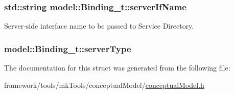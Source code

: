 \subsubsection[{\texorpdfstring{server\+If\+Name}{serverIfName}}]{\setlength{\rightskip}{0pt plus 5cm}std\+::string model\+::\+Binding\+\_\+t\+::server\+If\+Name}\hypertarget{structmodel_1_1_binding__t_aa1c6f9af2089f0734bd4465529584df8}{}\label{structmodel_1_1_binding__t_aa1c6f9af2089f0734bd4465529584df8}


Server-\/side interface name to be passed to Service Directory. 

\subsubsection[{\texorpdfstring{server\+Type}{serverType}}]{ model\+::\+Binding\+\_\+t\+::server\+Type}\hypertarget{structmodel_1_1_binding__t_a68d5c2bf7a05e0619b1e2704b8f931ed}{}\label{structmodel_1_1_binding__t_a68d5c2bf7a05e0619b1e2704b8f931ed}


The documentation for this struct was generated from the following file\+:\begin{DoxyCompactItemize}
\item 
framework/tools/mk\+Tools/conceptual\+Model/\hyperlink{conceptual_model_8h}{conceptual\+Model.\+h}\end{DoxyCompactItemize}
